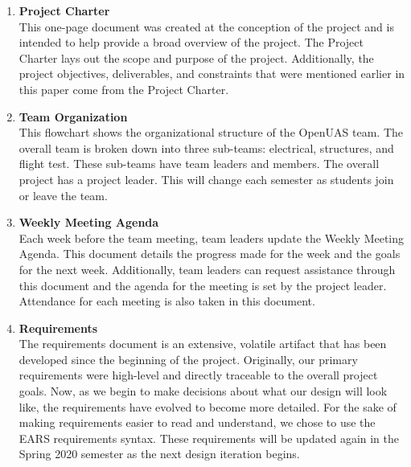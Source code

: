 \documentclass{article}
\begin{document}
\begin{enumerate}
\item \textbf{Project Charter}\\ This one-page document was created at the conception of the project and is intended to help provide a broad overview of the project. The Project Charter lays out the scope and purpose of the project. Additionally, the project objectives, deliverables, and constraints that were mentioned earlier in this paper come from the Project Charter. 
\item \textbf{Team Organization}\\ This flowchart shows the organizational structure of the OpenUAS team. The overall team is broken down into three sub-teams: electrical, structures, and flight test. These sub-teams have team leaders and members. The overall project has a project leader. This will change each semester as students join or leave the team. 
\item \textbf{Weekly Meeting Agenda}\\Each week before the team meeting, team leaders update the Weekly Meeting Agenda. This document details the progress made for the week and the goals for the next week. Additionally, team leaders can request assistance through this document and the agenda for the meeting is set by the project leader. Attendance for each meeting is also taken in this document. 
\item \textbf{Requirements}\\ The requirements document is an extensive, volatile artifact that has been developed since the beginning of the project. Originally, our primary requirements were high-level and directly traceable to the overall project goals. Now, as we begin to make decisions about what our design will look like, the requirements have evolved to become more detailed. For the sake of making requirements easier to read and understand, we chose to use the EARS \cite{Terzakis2013} requirements syntax. These requirements will be updated again in the Spring 2020 semester as the next design iteration begins. 
\end{enumerate}
\end{document}
